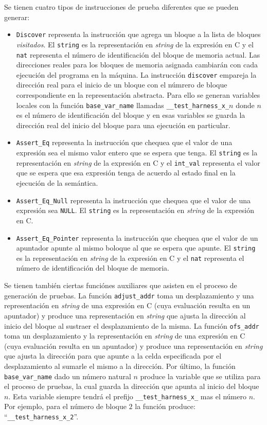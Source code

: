 Se tienen cuatro tipos de instrucciones de prueba diferentes que se pueden generar:

\begin{itemize}
  \item{\verb|Discover| representa la instrucción que agrega un bloque a la lista de bloques \textit{visitados}.
  El \verb|string| es la representación en \textit{string} de la expresión en C y el \verb|nat| representa el número de identificación del bloque de memoria actual.
  Las direcciones reales para los bloques de memoria asignada cambiarán con cada ejecución del programa en la máquina.
  La instrucción \verb|discover| empareja la dirección real para el inicio de un bloque con el númrero de bloque correspondiente en la representación abstracta.
  Para ello se generan variables locales con la función \verb|base_var_name| llamadas \verb|__test_harness_x_|$n$ donde $n$ es el número de identificación del bloque y en esas variables se guarda la dirección real del inicio del bloque para una ejecución en particular.}
  \item{\verb|Assert_Eq| representa la instrucción que chequea que el valor de una expresión sea el mismo valor entero que se espera que tenga.
  El \verb|string| es la representación en \textit{string} de la expresión en C y el \verb|int_val| representa el valor que se espera que esa expresión tenga de acuerdo al estado final en la ejecución de la semántica.}
  \item{\verb|Assert_Eq_Null| representa la instrucción que chequea que el valor de una expresión sea \verb|NULL|.
  El \verb|string| es la representación en \textit{string} de la expresión en C.}
  \item{\verb|Assert_Eq_Pointer| representa la instrucción que chequea que el valor de un apuntador apunte al mismo boloque al que se espera que apunte.
  El \verb|string| es la representación en \textit{string} de la expresión en C y el \verb|nat| representa el número de identificación del bloque de memoria.}
\end{itemize}

Se tienen también ciertas funciónes auxiliares que asisten en el proceso de generación de pruebas.
La función \verb|adjust_addr| toma un desplazamiento y una representación en \textit{string} de una expresión en C (cuya evaluación resulta en un apuntador) y produce una representación en \textit{string} que ajusta la dirección al inicio del bloque al sustraer el desplazamiento de la misma.
La función \verb|ofs_addr| toma un desplazamiento y la representación en \textit{string} de una expresión en C (cuya evaluación resulta en un apuntador) y produce una representación en \textit{string} que ajusta la dirección para que apunte a la celda especificada por el desplazamiento al sumarle el mismo a la dirección.
Por último, la función \verb|base_var_name| dado un número natural $n$ produce la variable que se utiliza para el proceso de pruebas, la cual guarda la dirección que apunta al inicio del bloque $n$.
Esta variable siempre tendrá el prefijo \verb|__test_harness_x_| mas el número $n$.
Por ejemplo, para el número de bloque $2$ la función produce: ``\verb|__test_harness_x_2|''.


